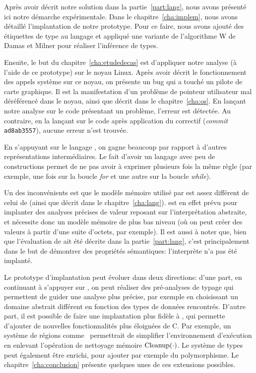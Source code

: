 Après avoir décrit notre solution dans la partie~\ref{part:lang}, nous avons
présenté ici notre démarche expérimentale. Dans le chapitre~\ref{cha:implem},
nous avons détaillé l'implantation de notre prototype. Pour ce faire, nous avons
ajouté des étiquettes de type au langage \newspeak et appliqué une variante de
l'algorithme W de Damas et Milner pour réaliser l'inférence de types.

Ensuite, le but du chapitre~\ref{cha:etudedecas} est d'appliquer notre analyse
(à l'aide de ce prototype) sur le noyau Linux. Après avoir décrit le
fonctionnement des appels système sur ce noyau, on présente un bug qui a touché
un pilote de carte graphique. Il est la manifestation d'un problème de pointeur
utilisateur mal déréférencé dans le noyau, ainsi que décrit dans le
chapitre~\ref{cha:os}. En lançant notre analyse sur le code présentant un
problème, l'erreur est détectée. Au contraire, en la lançant sur le code après
application du correctif (\emph{commit} \texttt{ad8ab3557}), aucune erreur n'est
trouvée.

En s'appuyant sur le langage \newspeak, on gagne beaucoup par rapport à d'autres
représentations intermédiaires. Le fait d'avoir un langage avec peu de
constructions permet de ne pas avoir à exprimer plusieurs fois la même règle
(par exemple, une fois sur la boucle \emph{for} et une autre sur la boucle
\emph{while}).

Un des inconvénients est que le modèle mémoire utilisé par \newspeak est assez
différent de celui de \langname (ainsi que décrit dans le
chapitre~\ref{cha:lang}). \newspeak est en effet prévu pour implanter des
analyses précises de valeur reposant sur l'interprétation abstraite, et
nécessite donc un modèle mémoire de plus bas niveau (où on peut créer des
valeurs à partir d'une suite d'octets, par exemple). Il est aussi à noter que,
bien que l'évaluation de \langname ait été décrite dans la
partie~\ref{part:lang}, c'est principalement dans le but de démontrer des
propriétés sémantiques: l'interprète n'a pas été implanté.

Le prototype d'implantation peut évoluer dans deux directions: d'une part, en
continuant à s'appuyer sur \newspeak, on peut réaliser des pré-analyses de
typage qui permettent de guider une analyse plus précise, par exemple en
choisissant un domaine abstrait différent en fonction des types de données
rencontrés. D'autre part, il est possible de faire une implantation plus fidèle
à \langname, qui permette d'ajouter de nouvelles fonctionnalités plus éloignées
de C. Par exemple, un système de régions comme~\cite{jfp92} permettrait de
simplifier l'environnement d'exécution en enlevant l'opération de nettoyage
mémoire $\mathrm{Cleanup}(\cdot)$. Le système de types peut également être enrichi, pour
ajouter par exemple du polymorphisme. Le chapitre~\ref{cha:conclusion} présente
quelques unes de ces extensions possibles.

